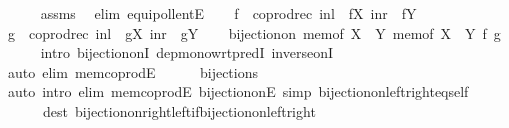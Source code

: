 \begin{isabellebody}
\ \ \ \ \isamarkupfalse%
\ assms\ \isamarkupfalse%
\ {\isacharparenleft}{\kern0pt}elim\ equipollentE{\isacharparenright}{\kern0pt}\isanewline
\ \ \isamarkupfalse%
\ {\isacharquery}{\kern0pt}f\ {\isacharequal}{\kern0pt}\ {\isachardoublequoteopen}coprod{\isacharunderscore}{\kern0pt}rec\ {\isacharparenleft}{\kern0pt}inl\ {\isasymcirc}\ fX{\isacharparenright}{\kern0pt}\ {\isacharparenleft}{\kern0pt}inr\ {\isasymcirc}\ fY{\isacharparenright}{\kern0pt}{\isachardoublequoteclose}\isanewline
\ \ \isamarkupfalse%
\ {\isacharquery}{\kern0pt}g\ {\isacharequal}{\kern0pt}\ {\isachardoublequoteopen}coprod{\isacharunderscore}{\kern0pt}rec\ {\isacharparenleft}{\kern0pt}inl\ {\isasymcirc}\ gX{\isacharparenright}{\kern0pt}\ {\isacharparenleft}{\kern0pt}inr\ {\isasymcirc}\ gY{\isacharparenright}{\kern0pt}{\isachardoublequoteclose}\isanewline
\ \ \isamarkupfalse%
\ {\isachardoublequoteopen}bijection{\isacharunderscore}{\kern0pt}on\ {\isacharparenleft}{\kern0pt}mem{\isacharunderscore}{\kern0pt}of\ {\isacharparenleft}{\kern0pt}X\ {\isasymCoprod}\ Y{\isacharparenright}{\kern0pt}{\isacharparenright}{\kern0pt}\ {\isacharparenleft}{\kern0pt}mem{\isacharunderscore}{\kern0pt}of\ {\isacharparenleft}{\kern0pt}X{\isacharprime}{\kern0pt}\ {\isasymCoprod}\ Y{\isacharprime}{\kern0pt}{\isacharparenright}{\kern0pt}{\isacharparenright}{\kern0pt}\ {\isacharquery}{\kern0pt}f\ {\isacharquery}{\kern0pt}g{\isachardoublequoteclose}\isanewline
\ \ \ \ \isamarkupfalse%
\ {\isacharparenleft}{\kern0pt}intro\ bijection{\isacharunderscore}{\kern0pt}onI\ dep{\isacharunderscore}{\kern0pt}mono{\isacharunderscore}{\kern0pt}wrt{\isacharunderscore}{\kern0pt}predI\ inverse{\isacharunderscore}{\kern0pt}onI{\isacharparenright}{\kern0pt}\isanewline
\ \ \ \ \isamarkupfalse%
\ {\isacharparenleft}{\kern0pt}auto\ elim{\isacharcolon}{\kern0pt}\ mem{\isacharunderscore}{\kern0pt}coprodE{\isacharparenright}{\kern0pt}\isanewline
\ \ \ \ \isamarkupfalse%
\ bijections\ \isamarkupfalse%
\ {\isacharparenleft}{\kern0pt}auto\ intro{\isacharcolon}{\kern0pt}\ elim{\isacharcolon}{\kern0pt}\ mem{\isacharunderscore}{\kern0pt}coprodE\ bijection{\isacharunderscore}{\kern0pt}onE\ simp{\isacharcolon}{\kern0pt}\ bijection{\isacharunderscore}{\kern0pt}on{\isacharunderscore}{\kern0pt}left{\isacharunderscore}{\kern0pt}right{\isacharunderscore}{\kern0pt}eq{\isacharunderscore}{\kern0pt}self\isanewline
\ \ \ \ \ \ dest{\isacharcolon}{\kern0pt}\ bijection{\isacharunderscore}{\kern0pt}on{\isacharunderscore}{\kern0pt}right{\isacharunderscore}{\kern0pt}left{\isacharunderscore}{\kern0pt}if{\isacharunderscore}{\kern0pt}bijection{\isacharunderscore}{\kern0pt}on{\isacharunderscore}{\kern0pt}left{\isacharunderscore}{\kern0pt}right{\isacharparenright}{\kern0pt}\isanewline

\end{isabellebody}
